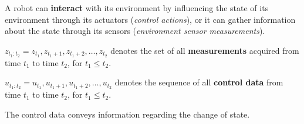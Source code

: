 A robot can \textbf{interact} with its environment by influencing the state of its environment through its actuators (\textit{control actions}), or it can gather information about the state through its sensors (\textit{environment sensor measurements}).
\begin{mydef}
$z_{t_1:t_2} = z_{t_1}, z_{t_1 + 1}, z_{t_1 + 2}, \hdots, z_{t_2}$ denotes the set of all \textbf{measurements} acquired from time $t_1$ to time $t_2$, for $t_1 \leq t_2$.
\end{mydef}
\begin{mydef}
$u_{t_1:t_2} = u_{t_1}, u_{t_1 + 1}, u_{t_1 + 2}, \hdots, u_{t_2}$ denotes the sequence of all \textbf{control data} from time $t_1$ to time $t_2$, for $t_1 \leq t_2$.
\end{mydef}
The control data conveys information regarding the change of state.
